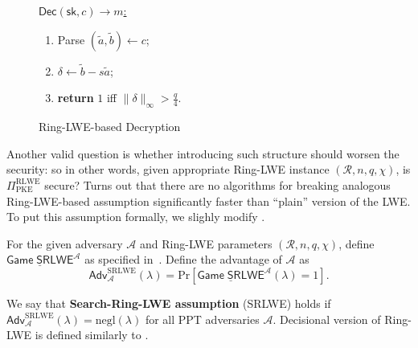 \documentclass{template}
\begin{document}
\begin{figure}[ht]
\begin{minipage}[t]{0.32\linewidth}
    \begin{mdframed}[linecolor=black, linewidth=1.0pt,
                     skipabove=5pt, skipbelow=5pt,
                     innerleftmargin=5pt, innerrightmargin=5pt]
        \centering
        \colorbox{green!10}{\underline{$\mathsf{Dec}(\mathsf{sk}, c) \to m$:}}
        \begin{enumerate}
            \item Parse $(\widetilde{a}, \widetilde{b}) \gets c$;
            \item $\delta \gets \widetilde{b} - s\widetilde{a}$;
            \item \textbf{return} $1$ iff $\|\delta\|_{\infty} > \frac{q}{4}$.
        \end{enumerate}
    \end{mdframed}
    \caption{Ring-LWE-based Decryption}
    \label{fig:ring-lwe-dec}
\end{minipage}
\end{figure}

Another valid question is whether introducing such structure should worsen the
security: so in other words, given appropriate Ring-LWE instance
$(\mathcal{R},n,q,\chi)$, is $\Pi_{\text{PKE}}^{\text{RLWE}}$ secure? Turns out
that there are no algorithms for breaking analogous Ring-LWE-based assumption
significantly faster than ``plain'' version of the LWE. To put this assumption
formally, we slighly modify .

\begin{definition}
    For the given adversary $\mathcal{A}$ and Ring-LWE parameters
    $(\mathcal{R},n,q,\chi)$, define $\underline{\mathsf{Game} \;
    \mathsf{SRLWE}}^{\mathcal{A}}$ as specified in~. Define
    the advantage of $\mathcal{A}$ as
    \begin{equation*}
        \mathsf{Adv}^{\text{SRLWE}}_{\mathcal{A}}(\lambda) = \text{Pr}\left[\underline{\mathsf{Game} \;
    \mathsf{SRLWE}}^{\mathcal{A}}(\lambda) = 1\right].
    \end{equation*}

    We say that \textbf{Search-Ring-LWE assumption} (SRLWE) holds if
    $\mathsf{Adv}^{\text{SRLWE}}_{\mathcal{A}}(\lambda)=\text{negl}(\lambda)$
    for all PPT adversaries $\mathcal{A}$. Decisional version of Ring-LWE is
    defined similarly to .
\end{definition}
\end{document}
